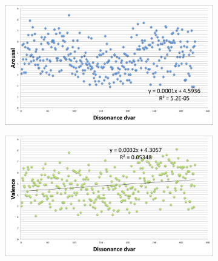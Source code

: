 \begin{figure}
	    \centering
        \begin{subfigure}[b]{0.48\textwidth}
                \includegraphics[width=\textwidth]{Figures/dissonancedvar-arousal}
			   \vspace{20pt}
        \end{subfigure}
        \begin{subfigure}[b]{0.48\textwidth}
                \includegraphics[width=\textwidth]{Figures/dissonancedvar-valence}
                  \vspace{20pt}
        \end{subfigure}        
        
    
        
\end{figure}